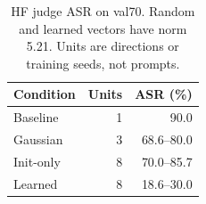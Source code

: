 \begin{table}[t]
\centering
\small
\setlength{\tabcolsep}{3pt}
\begin{tabular}{lrr}
\toprule
Condition & Units & ASR (\%) \\
\midrule
Baseline & 1 & 90.0 \\
Gaussian & 3 & 68.6--80.0 \\
Init-only & 8 & 70.0--85.7 \\
Learned & 8 & 18.6--30.0 \\
\bottomrule
\end{tabular}
\caption{HF judge ASR on val70. Random and learned vectors have norm 5.21. Units are directions or training seeds, not prompts.}
\label{tab:zeroline}
\end{table}
